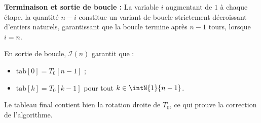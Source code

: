 \documentclass[11pt,a4paper]{article}
\begin{document}
\begin{Exercise}[title = {Rotation droite d'un tableau}]
{	\textbf{Terminaison et sortie de boucle :}
	La variable $i$ augmentant de $1$ à chaque étape, la quantité $n - i$ constitue un variant de boucle strictement décroissant d'entiers naturels, garantissant que la boucle termine après $n-1$ tours, lorsque $i = n$.
	
	En sortie de boucle, $\mathcal{I}(n)$ garantit que :
	\begin{itemize}
		\item $\text{tab}[0] = T_0[n-1]$ ;
		\item $\text{tab}[k] = T_0[k-1]$ pour tout $k \in \intN{1}{n-1}$.
	\end{itemize}
	Le tableau final contient bien la rotation droite de $T_0$, ce qui prouve la correction de l'algorithme.
	}

\end{Exercise}
\end{document}
